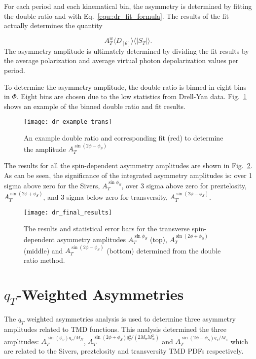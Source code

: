 For each period and each kinematical bin, the asymmetry is determined by fitting
the double ratio and with Eq.~\ref{equ::dr_fit_formula}.  The results of the fit
actually determines the quantity

\begin{equation}
  A^w_T \langle D_{[\theta]} \rangle \langle |S_T|\rangle.
\end{equation}
\noindent
The asymmetry amplitude is ultimately determined by dividing the fit results by
the average polarization and average virtual photon depolarization values per
period.

To determine the asymmetry amplitude, the double ratio is binned in eight bins
in $\Phi$.  Eight bins are chosen due to the low statistics from Drell-Yan data.
Fig.~\ref{fig::dr_example_trans} shows an example of the binned double ratio and
fit results.

\begin{figure}[h!t]
  \centering \texttt{[image: dr\_example\_trans]}
  \caption{An example double ratio and corresponding fit (red) to determine the
    amplitude $A_T^{\sin(2\phi-\phi_S)}$}
  \label{fig::dr_example_trans}
\end{figure}

\noindent
The results for all the spin-dependent asymmetry amplitudes are shown in
Fig.~\ref{fig::dr_final_results}.  As can be seen, the significance of the
integrated asymmetry amplitudes is: over 1 sigma above zero for the Sivers,
$A^{\sin\phi_S}_T$, over 3 sigma above zero for preztelosity,
$A^{\sin(2\phi+\phi_S)}_T$, and 3 sigma below zero for transversity,
$A^{\sin(2\phi-\phi_S)}_T$.

\begin{figure}[h!t]
  \centering \texttt{[image: dr\_final\_results]}
  \caption{The results and statistical error bars for the transverse
    spin-dependent asymmetry amplitudes $A^{\sin\phi_S}_T$ (top),
    $A^{\sin(2\phi+\phi_S)}_T$ (middle) and $A^{\sin(2\phi-\phi_S)}_T$ (bottom)
    determined from the double ratio method.}
  \label{fig::dr_final_results}
\end{figure}


\section{$q_T$-Weighted Asymmetries} \label{sec::qtweighted}
The $q_T$ weighted asymmetries analysis is used to determine three asymmetry
amplitudes related to TMD functions.  This analysis determined the three
amplitudes: $A_T^{\sin(\phi_S) q_T/M_N}$, $A_T^{\sin(2\phi+\phi_S)
  q^3_T/(2M_{\pi}M_N^2)}$ and $A_T^{\sin(2\phi-\phi_S) q_T/M_{\pi}}$ which are
related to the Sivers, preztelosity and transversity TMD PDFs respectively.

